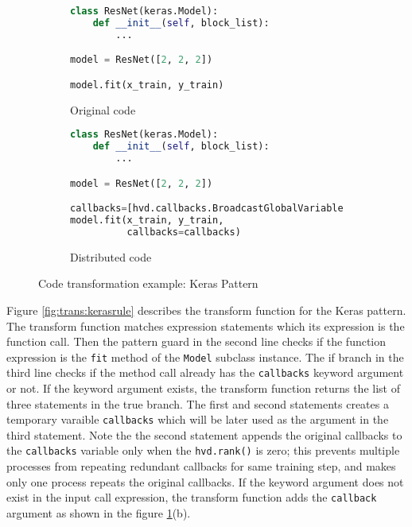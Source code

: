 \begin{figure}[ht!]
  \begin{subfigure}[t]{0.45\textwidth}
  \begin{lstlisting}[language=Python]
class ResNet(keras.Model):
    def __init__(self, block_list):
        ...

model = ResNet([2, 2, 2])

model.fit(x_train, y_train)
  \end{lstlisting}
  \caption{Original code}
  \end{subfigure}
  \hspace{3mm}
  \begin{subfigure}[t]{0.45\textwidth}
  \begin{lstlisting}[language=Python]
class ResNet(keras.Model):
    def __init__(self, block_list):
        ...

model = ResNet([2, 2, 2])

callbacks=[hvd.callbacks.BroadcastGlobalVariablesCallback(0)
model.fit(x_train, y_train,
          callbacks=callbacks)
  \end{lstlisting}
    \caption{Distributed code}
  \end{subfigure}
  \caption{Code transformation example: Keras Pattern}
  \label{fig:trans:keras}
\end{figure}


Figure \ref{fig:trans:kerasrule} describes the transform function 
for the Keras pattern.
The transform function matches expression statements which its expression
is the function call. 
Then the pattern guard in the second line checks if the function expression
is the {\tt fit} method of the {\tt Model} subclass instance.
The if branch in the third line checks if the method call already has
the {\tt callbacks} keyword argument or not.
If the keyword argument exists, the transform function returns the list of 
three statements in the true branch. The first and second statements
creates a temporary varaible {\tt callbacks} which will be later
used as the argument in the third statement.
Note the the second statement appends the original
callbacks to the {\tt callbacks} variable only when the {\tt hvd.rank()} 
is zero; this prevents multiple processes from repeating redundant callbacks
for same training step, and makes only one process repeats the original
callbacks.
If the keyword argument does not exist in the input call expression,
the transform function adds the {\tt callback} argument
as shown in the figure \ref{fig:trans:keras}(b).


